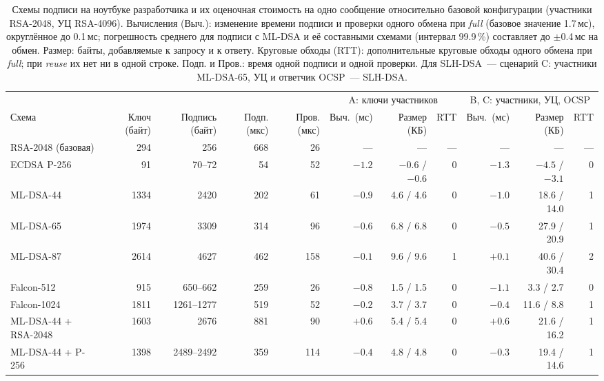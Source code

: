 \documentclass[conference,a4paper]{IEEEtran}
\newcommand{\newgreen}[1]{{\color{green!50!black}#1}}
\newcommand{\newviolet}[1]{{\color{violet}#1}}
\begin{document}
{\begin{table}[!tb]
\centering\footnotesize
\caption{Схемы подписи на ноутбуке разработчика и их оценочная стоимость на одно сообщение относительно
базовой конфигурации (участники RSA-2048, УЦ RSA-4096). Вычисления (Выч.): изменение времени подписи и проверки
одного обмена при \emph{full} (базовое значение 1.7\,мс)\newgreen{, округлённое до 0.1\,мс; погрешность
среднего для подписи с ML-DSA и её составными схемами (интервал 99.9\,\%) составляет до $\pm$0.4\,мс на
обмен}. Размер: байты, добавляемые к запросу и к
ответу. Круговые обходы (RTT): дополнительные круговые обходы одного обмена при \emph{full}; при \emph{reuse} их нет
ни в одной строке. Подп. и Пров.: время одной подписи и одной проверки. Для SLH-DSA~--- сценарий C: участники ML-DSA-65, УЦ и ответчик OCSP~--- SLH-DSA.}
\label{tab:pq}
\color{blue}
\setlength{\tabcolsep}{3.5pt}
\begin{tabular}{@{}lrrrrrrrrrr@{}}
\toprule
& & & & & \multicolumn{3}{c}{A: ключи участников} & \multicolumn{3}{c}{B, C: участники, УЦ, OCSP} \\
\cmidrule(lr){6-8}\cmidrule(l){9-11}
Схема & Ключ (байт) & Подпись (байт) & Подп. (мкс) & Пров. (мкс) & Выч.\ (мс) & Размер (КБ) & RTT
& Выч.\ (мс) & Размер (КБ) & RTT \\
\midrule
RSA-2048 (базовая) & 294 & 256 & 668 & 26 & --- & --- & --- & --- & --- & --- \\
ECDSA P-256 & 91 & 70--72 & 54 & 52 & \newgreen{$-1.2$} & $-0.6$ / $-0.6$ & 0 & \newgreen{$-1.3$} & $-4.5$ / $-3.1$ & \newviolet{0} \\
ML-DSA-44 & 1334 & 2420 & 202 & 61 & \newgreen{$-0.9$} & 4.6 / 4.6 & 0 & \newgreen{$-1.0$} & 18.6 / 14.0 & 1 \\
ML-DSA-65 & 1974 & 3309 & 314 & 96 & \newgreen{$-0.6$} & 6.8 / 6.8 & 0 & \newgreen{$-0.5$} & 27.9 / 20.9 & 1 \\
ML-DSA-87 & 2614 & 4627 & 462 & 158 & \newgreen{$-0.1$} & 9.6 / 9.6 & 1 & \newgreen{$+0.1$} & 40.6 / 30.4 & 2 \\
Falcon-512 & 915 & 650--662 & 259 & 26 & \newgreen{$-0.8$} & 1.5 / 1.5 & 0 & \newgreen{$-1.1$} & \newgreen{3.3 / 2.7} & 0 \\
Falcon-1024 & 1811 & 1261--1277 & 519 & 52 & \newgreen{$-0.2$} & 3.7 / 3.7 & 0 & \newgreen{$-0.4$} & 11.6 / 8.8 & 1 \\
ML-DSA-44 + RSA-2048 & 1603 & 2676 & 881 & 90 & \newgreen{$+0.6$} & 5.4 / 5.4 & 0 & \newgreen{$+0.6$} & 21.6 / 16.2 & 1 \\
ML-DSA-44 + P-256 & 1398 & 2489--2492 & 359 & 114 & \newgreen{$-0.4$} & 4.8 / 4.8 & 0 & \newgreen{$-0.3$} & 19.4 / 14.6 & 1 \\

\end{tabular}
\end{table}}
\end{document}
